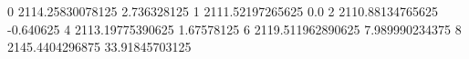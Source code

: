 0 2114.25830078125 2.736328125
1 2111.52197265625 0.0
2 2110.88134765625 -0.640625
4 2113.19775390625 1.67578125
6 2119.511962890625 7.989990234375
8 2145.4404296875 33.91845703125
